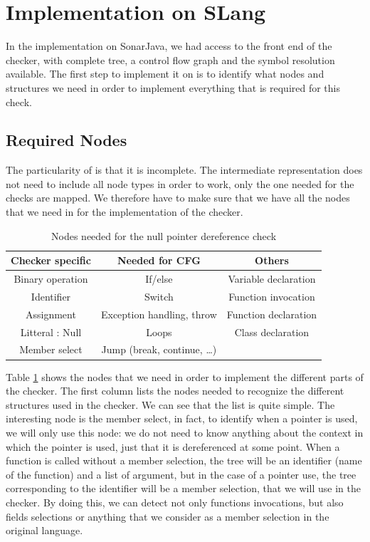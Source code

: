 \section{Implementation on SLang}
\label{sec:implementation_slang}

In the implementation on SonarJava, we had access to the front end of the checker, with complete tree, a control flow graph and the symbol resolution available.
The first step to implement it on \slang{} is to identify what nodes and structures we need in order to implement everything that is required for this check.

\subsection{Required Nodes}
\label{subsec:nodes}

The particularity of \slang{}  is that it is incomplete. 
The intermediate representation does not need to include all node types in order to work, only the one needed for the checks are mapped. 
We therefore have to make sure that we have all the nodes that we need in \slang{} for the implementation of the checker.

\begin{table}[h]
	\caption{Nodes needed for the null pointer dereference check}
	\label{table:nodes-needed}
	\begin{tabular}{|c|c|c|}
		\hline
		\bf Checker specific & \bf Needed for CFG & \bf Others  \\ \hline
	    Binary operation & If/else & Variable declaration \\
		Identifier & Switch & Function invocation \\
		Assignment & Exception handling, throw  & Function declaration \\
		Litteral : Null & Loops & Class declaration \\
		Member select & Jump (break, continue, …) & \\ \hline
	\end{tabular}
\end{table}

Table \ref{table:nodes-needed} shows the nodes that we need in order to implement the different parts of the checker.
The first column lists the nodes needed to recognize the different structures used in the checker. 
We can see that the list is quite simple. 
The interesting node is the member select, in fact, to identify when a pointer is used, we will only use this node: we do not need to know anything about the context in which the pointer is used, just that it is dereferenced at some point.
When a function is called without a member selection, the tree will be an identifier (name of the function) and a list of argument, but in the case of a pointer use, the tree corresponding to the identifier will be a member selection, that we will use in the checker.
By doing this, we can detect not only functions invocations, but also fields selections or anything that we consider as a member selection in the original language.

